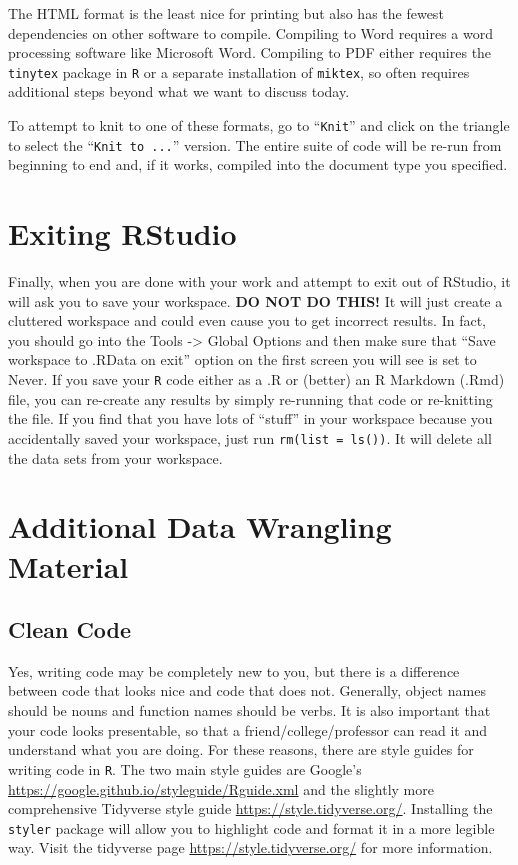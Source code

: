 \documentclass[
  10pt,
  letterpaper,
  twoside,
  openright]{book}
\begin{document}
The HTML format is the least nice for printing but also has the fewest
dependencies on other software to compile. Compiling to Word requires a
word processing software like Microsoft Word. Compiling to PDF either
requires the \texttt{tinytex} package in \texttt{R} or a separate
installation of \texttt{miktex}, so often requires additional steps
beyond what we want to discuss today.

To attempt to knit to one of these formats, go to ``\texttt{Knit}'' and
click on the triangle to select the ``\texttt{Knit\ to\ ...}'' version.
The entire suite of code will be re-run from beginning to end and, if it
works, compiled into the document type you specified.

\hypertarget{exiting-rstudio}{%
\section{Exiting RStudio}\label{exiting-rstudio}}

Finally, when you are done with your work and attempt to exit out of
RStudio, it will ask you to save your workspace. \textbf{DO NOT DO
THIS!} It will just create a cluttered workspace and could even cause
you to get incorrect results. In fact, you should go into the Tools
-\textgreater{} Global Options and then make sure that ``Save workspace
to .RData on exit'' option on the first screen you will see is set to
Never. If you save your \texttt{R} code either as a .R or (better) an R
Markdown (.Rmd) file, you can re-create any results by simply re-running
that code or re-knitting the file. If you find that you have lots of
``stuff'' in your workspace because you accidentally saved your
workspace, just run \texttt{rm(list\ =\ ls())}. It will delete all the
data sets from your workspace.

\hypertarget{additional-data-wrangling-material}{%
\section{Additional Data Wrangling
Material}\label{additional-data-wrangling-material}}

\hypertarget{clean-code-1}{%
\subsection{Clean Code}\label{clean-code-1}}

Yes, writing code may be completely new to you, but there is a
difference between code that looks nice and code that does not.
Generally, object names should be nouns and function names should be
verbs. It is also important that your code looks presentable, so that a
friend/college/professor can read it and understand what you are doing.
For these reasons, there are style guides for writing code in
\texttt{R}. The two main style guides are Google's
\url{https://google.github.io/styleguide/Rguide.xml} and the slightly
more comprehensive Tidyverse style guide
\url{https://style.tidyverse.org/}. Installing the \texttt{styler}
package will allow you to highlight code and format it in a more legible
way. Visit the tidyverse page \url{https://style.tidyverse.org/} for
more information.
\end{document}
